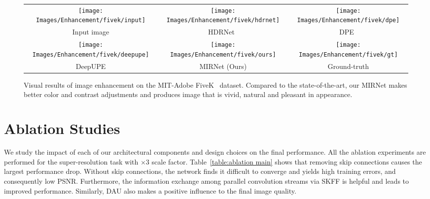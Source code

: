 \documentclass[runningheads]{llncs}
\begin{document}
\begin{figure}[!t]
  \begin{center}
    \tiny
    \begin{tabular}{ccc}\texttt{[image: Images/Enhancement/fivek/input]}&\hspace{-1.5mm}
      \texttt{[image: Images/Enhancement/fivek/hdrnet]}&\hspace{-1.5mm}
      \texttt{[image: Images/Enhancement/fivek/dpe]}\hspace{-1.5mm}
      \vspace{0.3mm}
      \\
      \vspace{0.5mm}
      Input image & HDRNet~\cite{Gharbi2017} & DPE~\cite{chen2018deep} \\
      \texttt{[image: Images/Enhancement/fivek/deepupe]}&\hspace{-1.5mm}
      \texttt{[image: Images/Enhancement/fivek/ours]}&\hspace{-1.5mm}
      \texttt{[image: Images/Enhancement/fivek/gt]}\hspace{-1.5mm}
      \vspace{0.3mm}
      \\
      \vspace{0.5mm}
       DeepUPE \cite{wei2018deep} & MIRNet (Ours)  & Ground-truth

    \end{tabular}
  \end{center}\vspace{-2em}
    \caption{\small Visual results of image enhancement on the MIT-Adobe FiveK~\cite{mit_fivek} dataset. 
Compared to the state-of-the-art, our MIRNet makes better color and contrast adjustments and produces image that is vivid, natural and pleasant in appearance. }
      \vspace{-1em}
    \label{Fig:qual_fivek}\vspace{-0em}
\end{figure}


\section{Ablation Studies}
We study the impact of each of our architectural components and design choices on the final performance. All the ablation experiments are performed for the super-resolution task with $\times3$ scale factor. 
Table~\ref{table:ablation main} shows that removing skip connections causes the largest performance drop. Without skip connections, the network finds it difficult to converge and yields high training errors, and consequently low PSNR.
Furthermore, the information exchange among parallel convolution streams via SKFF is helpful and leads to improved performance. 
Similarly, DAU also makes a positive influence to the final image quality. 
\end{document}
